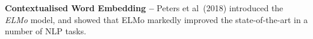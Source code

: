 \documentclass[12pt,a4paper]{article}
\begin{document}

\noindent \textbf{Contextualised Word Embedding --} Peters et al\ (2018) \cite{peters2018deep} introduced the \textit{ELMo} model, and showed that ELMo markedly improved the state-of-the-art in a number of NLP tasks.\\
\end{document}
